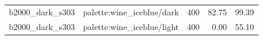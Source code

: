 \begin{longtable}{l>{\raggedright\arraybackslash}p{.42\linewidth}rrr}
b2000\_\allowbreak{}dark\_\allowbreak{}s303 & %
palette:wine\_\allowbreak{}iceblue/dark & %
400 & %
82.75 & %
99.39 \\ %

b2000\_\allowbreak{}dark\_\allowbreak{}s303 & %
palette:wine\_\allowbreak{}iceblue/light & %
400 & %
0.00 & %
55.10 \\ %


\end{longtable}
